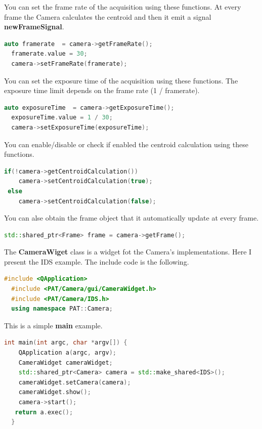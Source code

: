 You can set the frame rate of the acquisition using these functions. At
every frame the Camera calculates the centroid and then it emit a signal
\textbf{newFrameSignal}.

\begin{lstlisting}[language=c++, gobble=2]
  auto framerate  = camera->getFrameRate();
  framerate.value = 30;
  camera->setFrameRate(framerate);
\end{lstlisting}

You can set the exposure time of the acquisition using these functions.
The exposure time limit depends on the frame rate (1 / framerate).

\begin{lstlisting}[language=c++, gobble=2]
  auto exposureTime  = camera->getExposureTime();
  exposureTime.value = 1 / 30;
  camera->setExposureTime(exposureTime);
\end{lstlisting}

You can enable/disable or check if enabled the centroid calculation
using these functions.

\begin{lstlisting}[language=c++, gobble=2]
  if(!camera->getCentroidCalculation())
    camera->setCentroidCalculation(true);
 else
    camera->setCentroidCalculation(false);
\end{lstlisting}

You can alse obtain the frame object that it automatically update at
every frame.

\begin{lstlisting}[language=c++, gobble=2]
  std::shared_ptr<Frame> frame = camera->getFrame();
\end{lstlisting}


The \textbf{CameraWiget} class is a widget fot the Camera's
implementations. Here I present the IDS example. The include code is the
following.

\begin{lstlisting}[language=c++, gobble=2]
  #include <QApplication>
  #include <PAT/Camera/gui/CameraWidget.h>
  #include <PAT/Camera/IDS.h>
  using namespace PAT::Camera;
\end{lstlisting}

This is a simple \textbf{main} example.

\begin{lstlisting}[language=c++, gobble=2]
  int main(int argc, char *argv[]) {
    QApplication a(argc, argv);
    CameraWidget cameraWidget;
    std::shared_ptr<Camera> camera = std::make_shared<IDS>();
    cameraWidget.setCamera(camera);
    cameraWidget.show();
    camera->start();
   return a.exec();
  }
\end{lstlisting}


